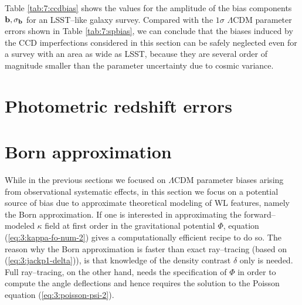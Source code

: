%
Table \ref{tab:7:ccdbias} shows the values for the amplitude of the bias components $\mathbf{b},\sigma_{\mathbf{b}}$ for an LSST--like galaxy survey. Compared with the $1\sigma$ $\Lambda$CDM parameter errors shown in Table \ref{tab:7:spbias}, we can conclude that the biases induced by the CCD imperfections considered in this section can be safely neglected even for a survey with an area as wide as LSST, because they are several order of magnitude smaller than the parameter uncertainty due to cosmic variance.  

\section{Photometric redshift errors}

\section{Born approximation}
While in the previous sections we focused on $\Lambda$CDM parameter biases arising from observational systematic effects, in this section we focus on a  potential source of bias due to approximate theoretical modeling of WL features, namely the Born approximation. If one is interested in approximating the forward--modeled $\kappa$ field at first order in the gravitational potential $\Phi$, equation (\ref{eq:3:kappa-fo-num-2}) gives a computationally efficient recipe to do so. The reason why the Born approximation is faster than exact ray--tracing (based on (\ref{eq:3:jackp1-delta})), is that knowledge of the density contrast $\delta$ only is needed. Full ray--tracing, on the other hand, needs the specification of $\Phi$ in order to compute the angle deflections and hence requires the solution to the Poisson equation (\ref{eq:3:poisson-psi-2}). 
%
